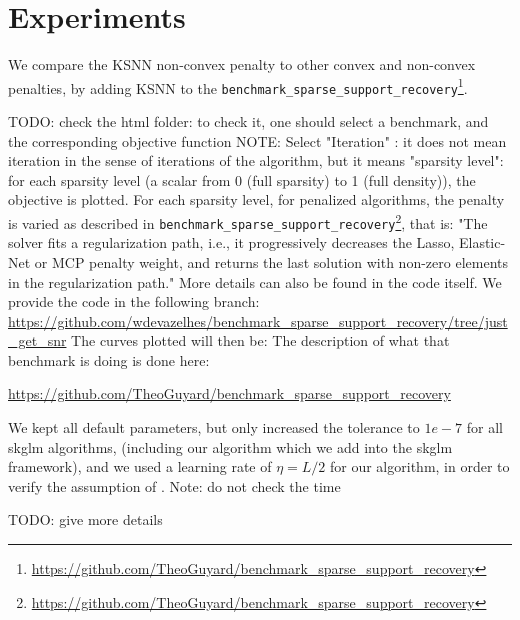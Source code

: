 \documentclass{article}
\begin{document}
\section{Experiments}

We compare the KSNN non-convex penalty to other convex and non-convex penalties, by adding KSNN to the \texttt{benchmark\_sparse\_support\_recovery}\footnote{\url{https://github.com/TheoGuyard/benchmark_sparse_support_recovery}}. 


TODO: check the html folder: to check it, one should select a benchmark, and the corresponding objective function
NOTE: Select "Iteration" : it does not mean iteration in the sense of iterations of the algorithm, but it means "sparsity level": for each sparsity level (a scalar from 0 (full sparsity) to 1 (full density)), the objective is plotted. 
For each sparsity level, for penalized algorithms, the penalty is varied as described in \texttt{benchmark\_sparse\_support\_recovery}\footnote{\url{https://github.com/TheoGuyard/benchmark_sparse_support_recovery}}, that is: "The solver fits a regularization path, i.e., it progressively decreases the Lasso, Elastic-Net or MCP penalty weight, and returns the last solution with  non-zero elements in the regularization path." More details can also be found in the code itself. We provide the code in the following branch: \url{https://github.com/wdevazelhes/benchmark_sparse_support_recovery/tree/just_get_snr}
The curves plotted will then be: 
The description of what that benchmark is doing is done here: 

\url{https://github.com/TheoGuyard/benchmark_sparse_support_recovery}


We kept all default parameters, but only increased the tolerance to $1e-7$ for all skglm algorithms, (including our algorithm which we add into the skglm framework), and we used a learning rate of $\eta = L/2$ for our algorithm, in order to verify the assumption of \cite{xu2019non}.
Note: do not check the time

TODO: give more details



\end{document}
